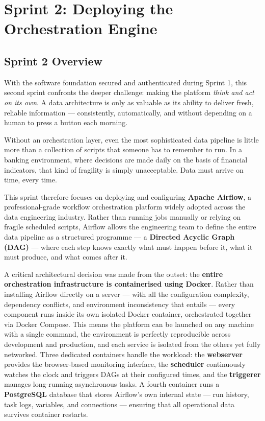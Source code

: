 \section{Sprint 2: Deploying the Orchestration Engine}

\subsection{Sprint 2 Overview}

With the software foundation secured and authenticated during Sprint 1, this second
sprint confronts the deeper challenge: making the platform \textit{think and act on
its own}. A data architecture is only as valuable as its ability to deliver fresh,
reliable information — consistently, automatically, and without depending on a human
to press a button each morning.

Without an orchestration layer, even the most sophisticated data pipeline is little
more than a collection of scripts that someone has to remember to run. In a banking
environment, where decisions are made daily on the basis of financial indicators, that
kind of fragility is simply unacceptable. Data must arrive on time, every time.

This sprint therefore focuses on deploying and configuring \textbf{Apache Airflow}, a
professional-grade workflow orchestration platform widely adopted across the data
engineering industry. Rather than running jobs manually or relying on fragile scheduled
scripts, Airflow allows the engineering team to define the entire data pipeline as a
structured programme — a \textbf{Directed Acyclic Graph (DAG)} — where each step knows
exactly what must happen before it, what it must produce, and what comes after it.

A critical architectural decision was made from the outset: the \textbf{entire
orchestration infrastructure is containerised using Docker}. Rather than installing
Airflow directly on a server — with all the configuration complexity, dependency
conflicts, and environment inconsistency that entails — every component runs inside
its own isolated Docker container, orchestrated together via Docker Compose. This
means the platform can be launched on any machine with a single command, the
environment is perfectly reproducible across development and production, and each
service is isolated from the others yet fully networked. Three dedicated containers
handle the workload: the \textbf{webserver} provides the browser-based monitoring
interface, the \textbf{scheduler} continuously watches the clock and triggers DAGs
at their configured times, and the \textbf{triggerer} manages long-running asynchronous
tasks. A fourth container runs a \textbf{PostgreSQL} database that stores Airflow's
own internal state — run history, task logs, variables, and connections — ensuring
that all operational data survives container restarts.

